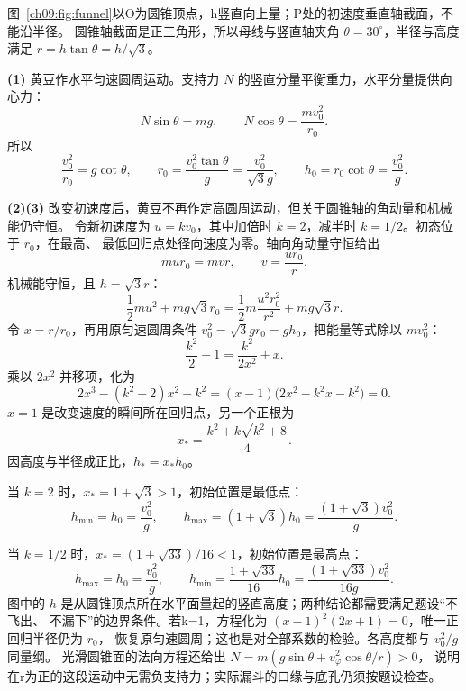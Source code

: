 \begin{xesolution}
图~\ref{ch09:fig:funnel}以O为圆锥顶点，h竖直向上量；P处的初速度垂直轴截面，不能沿半径。
圆锥轴截面是正三角形，所以母线与竖直轴夹角 $\theta=30^\circ$，半径与高度满足
$r=h\tan\theta=h/\sqrt3$。

\textbf{(1)} 黄豆作水平匀速圆周运动。支持力 $N$ 的竖直分量平衡重力，水平分量提供向心力：
\[
 N\sin\theta=mg,
 \qquad
 N\cos\theta=\frac{mv_0^2}{r_0}.
\]
所以
\[
 \frac{v_0^2}{r_0}=g\cot\theta,
 \qquad r_0=\frac{v_0^2\tan\theta}{g}=\boxed{\frac{v_0^2}{\sqrt3g}},
 \qquad
 h_0=r_0\cot\theta=\boxed{\frac{v_0^2}{g}}.
\]

\textbf{(2)(3)} 改变初速度后，黄豆不再作定高圆周运动，但关于圆锥轴的角动量和机械能仍守恒。
令新初速度为 $u=kv_0$，其中加倍时 $k=2$，减半时 $k=1/2$。初态位于 $r_0$，在最高、
最低回归点处径向速度为零。轴向角动量守恒给出
\[
 mur_0=mvr,
 \qquad v=\frac{ur_0}{r}.
\]
机械能守恒，且 $h=\sqrt3r$：
\[
 \frac12mu^2+mg\sqrt3r_0
 =\frac12m\frac{u^2r_0^2}{r^2}+mg\sqrt3r.
\]
令 $x=r/r_0$，再用原匀速圆周条件 $v_0^2=\sqrt3gr_0=gh_0$，把能量等式除以 $mv_0^2$：
\[
 \frac{k^2}{2}+1=\frac{k^2}{2x^2}+x.
\]
乘以 $2x^2$ 并移项，化为
\[
 2x^3-(k^2+2)x^2+k^2
 =(x-1)\bigl(2x^2-k^2x-k^2\bigr)=0.
\]
$x=1$ 是改变速度的瞬间所在回归点，另一个正根为
\[
 x_* =\frac{k^2+k\sqrt{k^2+8}}{4}.
\]
因高度与半径成正比，$h_*=x_*h_0$。

当 $k=2$ 时，$x_*=1+\sqrt3>1$，初始位置是最低点：
\[
 \boxed{h_{\min}=h_0=\frac{v_0^2}{g}},
 \qquad
 \boxed{h_{\max}=(1+\sqrt3)h_0
 =\frac{(1+\sqrt3)v_0^2}{g}}.
\]
\end{xesolution}

\begin{solutioncontinuation}
当 $k=1/2$ 时，$x_*=(1+\sqrt{33})/16<1$，初始位置是最高点：
\[
 \boxed{h_{\max}=h_0=\frac{v_0^2}{g}},
 \qquad
 \boxed{h_{\min}=\frac{1+\sqrt{33}}{16}h_0
 =\frac{(1+\sqrt{33})v_0^2}{16g}}.
\]
图中的 $h$ 是从圆锥顶点所在水平面量起的竖直高度；两种结论都需要满足题设“不飞出、
不漏下”的边界条件。若k=1，方程化为 $(x-1)^2(2x+1)=0$，唯一正回归半径仍为 $r_0$，
恢复原匀速圆周；这也是对全部系数的检验。各高度都与 $v_0^2/g$ 同量纲。
光滑圆锥面的法向方程还给出 $N=m(g\sin\theta+v_\varphi^2\cos\theta/r)>0$，
说明在r为正的这段运动中无需负支持力；实际漏斗的口缘与底孔仍须按题设检查。
\end{solutioncontinuation}
